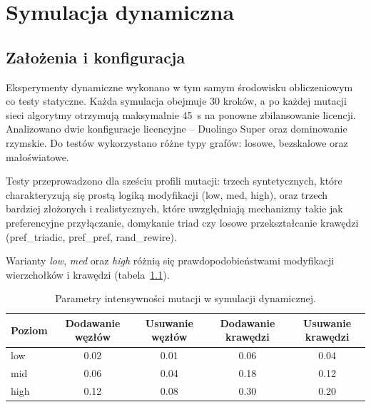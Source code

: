 \chapter{Symulacja dynamiczna}\label{chap:dynamic}

\section{Założenia i konfiguracja}

Eksperymenty dynamiczne wykonano w tym samym środowisku obliczeniowym co testy statyczne. Każda symulacja obejmuje 30 kroków, a po każdej mutacji sieci algorytmy otrzymują maksymalnie 45~s na ponowne zbilansowanie licencji. Analizowano dwie konfiguracje licencyjne -- Duolingo Super oraz dominowanie rzymskie. Do testów wykorzystano różne typy grafów: losowe, bezskalowe oraz małoświatowe.

Testy przeprowadzono dla sześciu profili mutacji: trzech syntetycznych, które charakteryzują się prostą logiką modyfikacji (low, med, high), oraz trzech bardziej złożonych i realistycznych, które uwzględniają mechanizmy takie jak preferencyjne przyłączanie, domykanie triad czy losowe przekształcanie krawędzi (pref\_triadic, pref\_pref, rand\_rewire).

Warianty \emph{low}, \emph{med} oraz \emph{high} różnią się prawdopodobieństwami modyfikacji wierzchołków i krawędzi (tabela~\ref{tab:dyn-mutation-levels}).

\begin{table}[H]
  \centering
  \caption{Parametry intensywności mutacji w symulacji dynamicznej.}
  \label{tab:dyn-mutation-levels}
  \begin{tabular}{lcccc}
    \toprule
    \textbf{Poziom} & \textbf{Dodawanie węzłów} & \textbf{Usuwanie węzłów} & \textbf{Dodawanie krawędzi} & \textbf{Usuwanie krawędzi} \\
    \midrule
    low             & 0.02                      & 0.01                     & 0.06                        & 0.04                       \\
    mid             & 0.06                      & 0.04                     & 0.18                        & 0.12                       \\
    high            & 0.12                      & 0.08                     & 0.30                        & 0.20                       \\
  \end{tabular}
\end{table}


